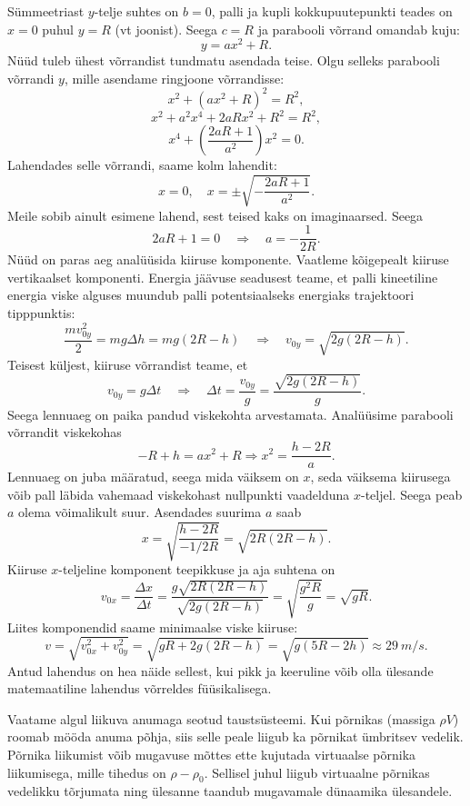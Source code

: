 \documentclass[10pt, twoside]{article}
\begin{document}
{Sümmeetriast $y$-telje suhtes on $b = 0$, palli ja kupli kokkupuutepunkti teades on $x = 0$ puhul $y = R$ (vt joonist). Seega $c = R$ ja parabooli võrrand omandab kuju:
\[
y = ax^2 + R.
\]
Nüüd tuleb ühest võrrandist tundmatu asendada teise. Olgu selleks parabooli võrrandi $y$, mille asendame ringjoone võrrandisse:
\[
x^{2}+\left(a x^{2}+R\right)^{2}=R^{2},
\]
\[
x^{2}+a^{2} x^{4}+2 a R x^{2}+R^{2}=R^{2},
\]
\[
x^{4}+\left(\frac{2 a R+1}{a^{2}}\right) x^{2}=0.
\]
Lahendades selle võrrandi, saame kolm lahendit:
\[
x=0, \quad x=\pm \sqrt{-\frac{2 a R+1}{a^{2}}}.
\]
Meile sobib ainult esimene lahend, sest teised kaks on imaginaarsed. Seega
\[
2aR + 1 = 0 \quad\Rightarrow\quad a = - \frac{1}{2R}.
\]
Nüüd on paras aeg analüüsida kiiruse komponente. Vaatleme kõigepealt kiiruse vertikaalset komponenti. Energia jäävuse seadusest teame, et palli kineetiline energia viske alguses muundub palli potentsiaalseks energiaks trajektoori tipppunktis:
\[
\frac{m v_{0 y}^{2}}{2}=m g \Delta h=m g(2 R-h) \quad\Rightarrow\quad v_{0 y}=\sqrt{2 g(2 R-h)}.
\]
Teisest küljest, kiiruse võrrandist teame, et
\[
v_{0 y}=g \Delta t \quad \Rightarrow \quad \Delta t=\frac{v_{0 y}}{g}=\frac{\sqrt{2 g(2 R-h)}}{g}.
\]
Seega lennuaeg on paika pandud viskekohta arvestamata. Analüüsime parabooli võrrandit viskekohas
\[
-R + h = ax^2 + R \Rightarrow x^2 = \frac{h-2R}{a}.
\]
Lennuaeg on juba määratud, seega mida väiksem on $x$, seda väiksema kiirusega võib pall läbida vahemaad viskekohast nullpunkti vaadelduna $x$-teljel. Seega peab $a$ olema võimalikult suur. Asendades suurima $a$ saab
\[
x=\sqrt{\frac{h-2 R}{-1 / 2 R}}=\sqrt{2 R(2 R-h)}.
\]
Kiiruse $x$-teljeline komponent teepikkuse ja aja suhtena on
\[
v_{0 x}=\frac{\Delta x}{\Delta t}=\frac{g \sqrt{2 R(2 R-h)}}{\sqrt{2 g(2 R-h)}}=\sqrt{\frac{g^{2} R}{g}}=\sqrt{g R}.
\]
Liites komponendid saame minimaalse viske kiiruse:
\[
v=\sqrt{v_{0 x}^{2}+v_{0 y}^{2}}=\sqrt{g R+2 g(2 R-h)}=\sqrt{g(5 R-2 h)} \approx \SI{29}{m/s}.
\]
Antud lahendus on hea näide sellest, kui pikk ja keeruline võib olla ülesande matemaatiline lahendus võrreldes füüsikalisega.
\probend
\bigskip


\solu
Vaatame algul liikuva anumaga seotud taustsüsteemi. Kui põrnikas (massiga $\rho V$) roomab mööda anuma põhja, siis selle peale liigub ka põrnikat ümbritsev vedelik. Põrnika liikumist võib mugavuse mõttes ette kujutada virtuaalse põrnika liikumisega, mille tihedus on $\rho - \rho_0$. Sellisel juhul liigub virtuaalne põrnikas vedelikku tõrjumata ning ülesanne taandub mugavamale dünaamika ülesandele.

}
\end{document}
